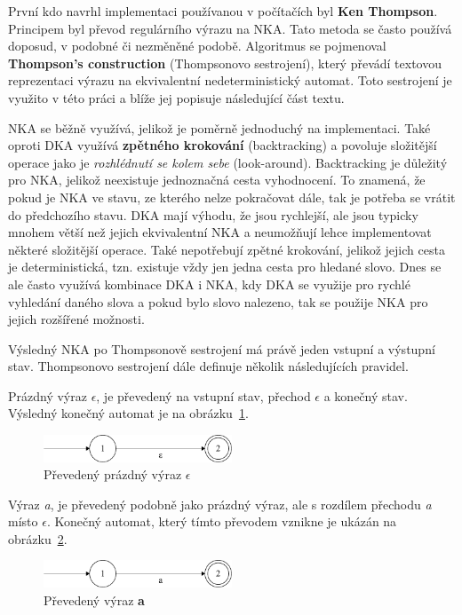 První kdo navrhl implementaci používanou v počítačích byl \textbf{Ken Thompson}.
Principem byl převod regulárního výrazu na NKA.
Tato metoda se často používá doposud, v podobné či nezměněné podobě.
Algoritmus se pojmenoval \textbf{Thompson's construction} (Thompsonovo sestrojení), který převádí textovou reprezentaci výrazu na ekvivalentní nedeterministický automat.
Toto sestrojení je využito v této práci a blíže jej popisuje následující část textu.

NKA se běžně využívá, jelikož je poměrně jednoduchý na implementaci.
Také oproti DKA využívá \textbf{zpětného krokování} (backtracking) a povoluje složitější operace jako je \textit{rozhlédnutí se kolem sebe} (look-around).
Backtracking je důležitý pro NKA, jelikož neexistuje jednoznačná cesta vyhodnocení.
To znamená, že pokud je NKA ve stavu, ze kterého nelze pokračovat dále, tak je potřeba se vrátit do předchozího stavu.
DKA mají výhodu, že jsou rychlejší, ale jsou typicky mnohem větší než jejich ekvivalentní NKA a neumožňují lehce implementovat některé složitější operace.
Také nepotřebují zpětné krokování, jelikož jejich cesta je deterministická, tzn. existuje vždy jen jedna cesta pro hledané slovo.
Dnes se ale často využívá kombinace DKA i NKA, kdy DKA se využije pro rychlé vyhledání daného slova a pokud bylo slovo nalezeno, 
tak se použije NKA pro jejich rozšířené možnosti.

Výsledný NKA po Thompsonově sestrojení má právě jeden vstupní a výstupní stav. 
Thompsonovo sestrojení dále definuje několik následujících pravidel.

Prázdný výraz \textit{$\epsilon$}, je převedený na vstupní stav, přechod \textit{$\epsilon$} a konečný stav.
Výsledný konečný automat je na obrázku~\ref{fig:NFAepsilon}.
\begin{figure}[!h]
	\centering
	\includegraphics[width=0.5\textwidth]{Figures/NFA_epsilon.pdf}
	\caption{Převedený prázdný výraz \textbf{$\epsilon$}}
	\label{fig:NFAepsilon}
\end{figure}

Výraz \textit{a}, je převedený podobně jako prázdný výraz, ale s rozdílem přechodu \textit{a} místo \textit{$\epsilon$}.
Konečný automat, který tímto převodem vznikne je ukázán na obrázku~\ref{fig:NFAa}.
\begin{figure}[!h]
	\centering
	\includegraphics[width=0.5\textwidth]{Figures/NFA_a.pdf}
	\caption{Převedený výraz \textbf{a}}
	\label{fig:NFAa}
\end{figure}

